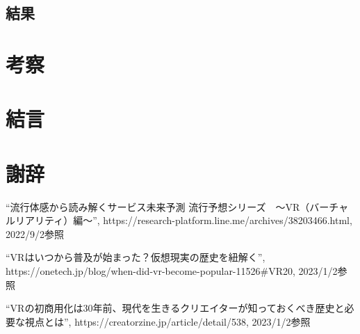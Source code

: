 \documentclass[12pt,a4j]{ltjsarticle}
\begin{document}
\subsection{結果}
\section{考察}
\section{結言}
\section{謝辞}
\begin{thebibliography}{99}
  ``流行体感から読み解くサービス未来予測 流行予想シリーズ　～VR（バーチャルリアリティ）編～'', https://research-platform.line.me/archives/38203466.html, 2022/9/2参照

  ``VRはいつから普及が始まった？仮想現実の歴史を紐解く'', https://onetech.jp/blog/when-did-vr-become-popular-11526\#VR20, 2023/1/2参照

  ``VRの初商用化は30年前、現代を生きるクリエイターが知っておくべき歴史と必要な視点とは'', https://creatorzine.jp/article/detail/538, 2023/1/2参照


\end{thebibliography}
\end{document}
